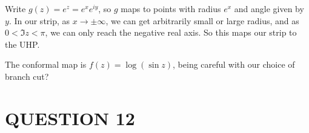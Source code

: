 \documentclass[a4paper]{article}
\begin{document}
Write $ g(z) = e^{z} = e^{x}e^{iy} $, so $ g $ maps to points with radius $ e^{x} $ and angle given by $ y $. In our strip, as $ x \to \pm \infty $, we can get arbitrarily small or large radius, and as $ 0 < \Im z < \pi $, we can only reach the negative real axis. So this maps our strip to the UHP.



The conformal map is $ f(z) = \log (\sin z) $, being careful with our choice of branch cut?


\section{QUESTION 12}
\end{document}
